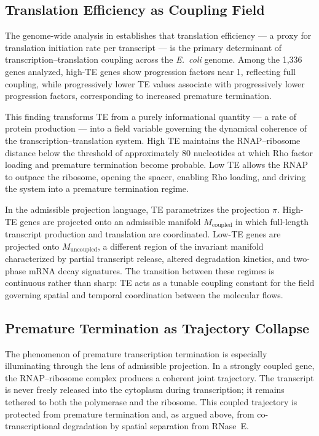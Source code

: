 \documentclass[12pt, a4paper]{article}
\theoremstyle{essaystyle}
\begin{document}
\subsection{Translation Efficiency as Coupling Field}

The genome-wide analysis in \citet{kim2026spatial} establishes that translation
efficiency --- a proxy for translation initiation rate per transcript --- is the primary
determinant of transcription--translation coupling across the \textit{E.~coli} genome.
Among the 1,336 genes analyzed, high-TE genes show progression factors near 1,
reflecting full coupling, while progressively lower TE values associate with
progressively lower progression factors, corresponding to increased premature
termination.

This finding transforms TE from a purely informational quantity --- a rate of protein
production --- into a field variable governing the dynamical coherence of the
transcription--translation system. High TE maintains the RNAP--ribosome distance below
the threshold of approximately 80 nucleotides at which Rho factor loading and premature
termination become probable. Low TE allows the RNAP to outpace the ribosome, opening
the spacer, enabling Rho loading, and driving the system into a premature termination
regime.

In the admissible projection language, TE parametrizes the projection $\pi$. High-TE
genes are projected onto an admissible manifold $M_{\mathrm{coupled}}$ in which
full-length transcript production and translation are coordinated. Low-TE genes are
projected onto $M_{\mathrm{uncoupled}}$, a different region of the invariant manifold
characterized by partial transcript release, altered degradation kinetics, and two-phase
mRNA decay signatures. The transition between these regimes is continuous rather than
sharp: TE acts as a tunable coupling constant for the field governing spatial and
temporal coordination between the molecular flows.

\subsection{Premature Termination as Trajectory Collapse}

The phenomenon of premature transcription termination is especially illuminating through
the lens of admissible projection. In a strongly coupled gene, the RNAP--ribosome
complex produces a coherent joint trajectory. The transcript is never freely released
into the cytoplasm during transcription; it remains tethered to both the polymerase and
the ribosome. This coupled trajectory is protected from premature termination and, as
argued above, from co-transcriptional degradation by spatial separation from RNase~E.
\end{document}

